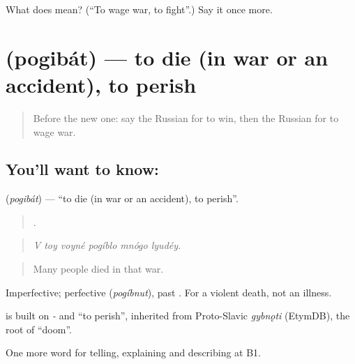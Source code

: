 \begin{tcolorbox}[breakable,colback=teal!4,colframe=teal!35!black,title={Before you move on}]
What does  mean? (\textquotedblleft{}To wage war, to fight\textquotedblright{}.) Say it once more.
\end{tcolorbox}
\section[\texorpdfstring{\ru{погибать} (pogibát)}{погибать (pogibát)}]{ (pogibát) — to die (in war or an accident), to perish}

\label{lesson:RU-C324-pogibat}



\begin{quote}
Before the new one: say the Russian for to win, then the Russian for to wage war.
\end{quote}

\subsection*{You'll want to know: }
\textbf{} (\emph{pogibát}) — \textquotedblleft{}to die (in war or an accident), to perish\textquotedblright{}.

\begin{quote}
     .
\end{quote}

\begin{quote}
\emph{V toy voyné pogíblo mnógo lyudéy.}
\end{quote}

\begin{quote}
Many people died in that war.
\end{quote}

Imperfective; perfective \emph{} (\emph{pogíbnut}), past \emph{}. For a violent death, not an illness.

\begin{cousinweb}
\emph{} is built on \emph{-} and \emph{} \textquotedblleft{}to perish\textquotedblright{}, inherited from Proto-Slavic \emph{gybnǫti} (EtymDB), the root of \emph{} \textquotedblleft{}doom\textquotedblright{}.
\end{cousinweb}

\begin{grammarlens}[title={What you've built}]
One more word for telling, explaining and describing at B1.
\end{grammarlens}


